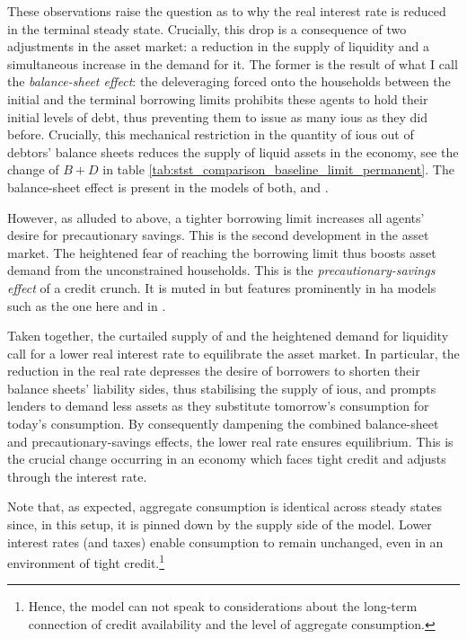 \documentclass[12pt]{article} %
\numberwithin{equation}{section} %
\numberwithin{figure}{section}
\numberwithin{table}{section}
\begin{document}
These observations raise the question as to why the real interest rate is reduced in the terminal steady state. Crucially, this drop is a consequence of two adjustments in the asset market: a reduction in the supply of liquidity and a simultaneous increase in the demand for it. The former is the result of what I call the \textit{balance-sheet effect}: the deleveraging forced onto the households between the initial and the terminal borrowing limits prohibits these agents to hold their initial levels of debt, thus preventing them to issue as many \Gls{iou}s as they did before. Crucially, this mechanical restriction in the quantity of \Gls{iou}s out of debtors' balance sheets reduces the supply of liquid assets in the economy, see the change of $B + D$ in table \ref{tab:stst_comparison_baseline_limit_permanent}. The balance-sheet effect is present in the models of both, \textcite{egg2012} and \textcite{gl2017}. 

However, as alluded to above, a tighter borrowing limit increases all agents' desire for precautionary savings. This is the second development in the asset market. The heightened fear of reaching the borrowing limit thus boosts asset demand from the unconstrained households. This is the \textit{precautionary-savings effect} of a credit crunch. It is muted in \textcite{egg2012} but features prominently in \Gls{ha} models such as the one here and in \textcite{gl2017}. 

Taken together, the curtailed supply of and the heightened demand for liquidity call for a lower real interest rate to equilibrate the asset market. In particular, the reduction in the real rate depresses the desire of borrowers to shorten their balance sheets' liability sides, thus stabilising the supply of \Gls{iou}s, and prompts lenders to demand less assets as they substitute tomorrow's consumption for today's consumption. By consequently dampening the combined balance-sheet and precautionary-savings effects, the lower real rate ensures equilibrium. This is the crucial change occurring in an economy which faces tight credit and adjusts through the interest rate.

Note that, as expected, aggregate consumption is identical across steady states since, in this setup, it is pinned down by the supply side of the model. Lower interest rates (and taxes) enable consumption to remain unchanged, even in an environment of tight credit.\footnote{Hence, the model can not speak to considerations about the long-term connection of credit availability and the level of aggregate consumption.}
\end{document}
